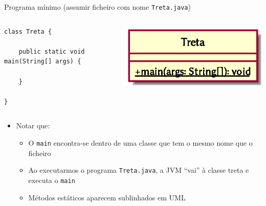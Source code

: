 \documentclass[portuguese, aspectratio=169, xcolor=table]{beamer}
\begin{document}
\begin{frame}[fragile]{Programa mínimo (assumir ficheiro com nome \texttt{Treta.java})}
\begin{columns}
    \begin{verbatim}
class Treta {

    public static void main(String[] args) {

    }

}
\end{verbatim}
\begin{center}
    \includegraphics[width=0.5\linewidth]{./uml_diagrams/class1}
\end{center}
\end{columns}
\vfill

\begin{itemize}
    \item Notar que:
    \begin{itemize}
        \item O \texttt{main} encontra-se dentro de uma classe que tem o mesmo nome que o ficheiro
        \item Ao executarmos o programa \texttt{Treta.java}, a JVM ``vai'' à classe treta e executa o \texttt{main}
        \item Métodos estáticos aparecem sublinhados em UML
    \end{itemize}
\end{itemize}
\end{frame}
\end{document}
